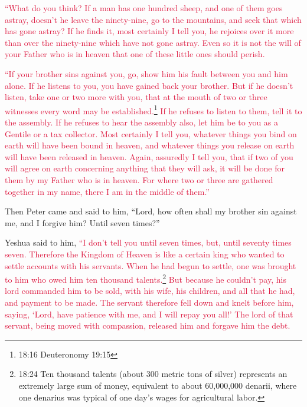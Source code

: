 \myverse{}\textcolor{crimson}{“What do you think? If a man has one hundred sheep, and
	one of them goes astray, doesn’t he leave the ninety-nine, go to the mountains, and seek that which has
	gone astray?
}
\myverse{}\textcolor{crimson}{If he finds it, most certainly I tell you, he rejoices over it more than
	over the ninety-nine which have not gone astray.
}
\myverse{}\textcolor{crimson}{Even so it is not the will of your Father who is in heaven that one of
	these little ones should perish.}

\myverse{}\textcolor{crimson}{“If your brother sins against you, go, show him his fault
	between you and him alone. If he listens to you, you have gained back your brother.
}
\myverse{}\textcolor{crimson}{But if he doesn’t listen, take one or two more with you, that at the
	mouth of two or three witnesses every word may be established.}\footnote{18:16 Deuteronomy 19:15}
\myverse{}\textcolor{crimson}{If he refuses to listen to them, tell it to the assembly. If he refuses
	to hear the assembly also, let him be to you as a Gentile or a tax collector.
}
\myverse{}\textcolor{crimson}{Most certainly I tell you, whatever things you bind on earth will have
	been bound in heaven, and whatever things you release on earth will have been released in heaven.
}
\myverse{}\textcolor{crimson}{Again, assuredly I tell you, that if two of you will agree on earth concerning
	anything that they will ask, it will be done for them by my Father who is in heaven.
}
\myverse{}\textcolor{crimson}{For where two or three are gathered together in my name, there I am in
	the middle of them.”}

\myverse{}Then Peter came and said to him, “Lord, how often shall my brother
sin against me, and I forgive him? Until seven times?”

\myverse{}Yeshua said to him,
\textcolor{crimson}{“I don’t tell you until seven times, but, until seventy times seven.
}
\myverse{}\textcolor{crimson}{Therefore the Kingdom of Heaven is like a certain king who wanted to
	settle accounts with his servants.
}
\myverse{}\textcolor{crimson}{When he had begun to settle, one was brought to him who owed him ten
	thousand talents.}\footnote{18:24 Ten thousand talents (about 300 metric tons of silver) represents an extremely large sum of money,
	equivalent to about 60,000,000 denarii, where one denarius was typical of one day’s wages for agricultural
	labor.}
\myverse{}\textcolor{crimson}{But because he couldn’t pay, his lord commanded him to be sold, with
	his wife, his children, and all that he had, and payment to be made.
}
\myverse{}\textcolor{crimson}{The servant therefore fell down and knelt before him, saying, ‘Lord,
	have patience with me, and I will repay you all!’
}
\myverse{}\textcolor{crimson}{The lord of that servant, being moved with compassion, released him and
	forgave him the debt.}

